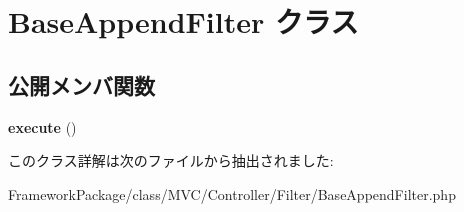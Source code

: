 \hypertarget{class_base_append_filter}{}\section{Base\+Append\+Filter クラス}
\label{class_base_append_filter}
\subsection*{公開メンバ関数}
\begin{DoxyCompactItemize}
\item 
\hypertarget{class_base_append_filter_a670b60ec4105736d8f64d1b6f28b2b16}{}{\bfseries execute} ()\label{class_base_append_filter_a670b60ec4105736d8f64d1b6f28b2b16}

\end{DoxyCompactItemize}


このクラス詳解は次のファイルから抽出されました\+:\begin{DoxyCompactItemize}
\item 
Framework\+Package/class/\+M\+V\+C/\+Controller/\+Filter/Base\+Append\+Filter.\+php\end{DoxyCompactItemize}

